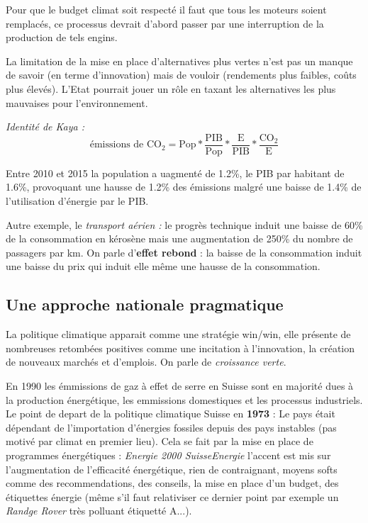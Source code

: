 \documentclass {article}
\newcommand{\V}[0]{\vspace{1\baselineskip}}
\begin{document}
\begin{itemize}
Pour que le budget climat soit respecté il faut que tous les moteurs soient remplacés, ce processus devrait d'abord passer par une interruption de la production de tels engins.

La limitation de la mise en place d'alternatives plus vertes n'est pas un manque de savoir (en terme d'innovation) mais de vouloir (rendements plus faibles, coûts plus élevés). L'Etat pourrait jouer un rôle en taxant les alternatives les plus mauvaises pour l'environnement.
\V

\textit{Identité de Kaya :}
$$\boxed{\textrm{émissions de CO$_2$} = \textrm{Pop} * \frac{\textrm{PIB}}{\textrm{Pop}} * \frac{\textrm{E}}{\textrm{PIB}} * \frac{\textrm{CO}_2}{\textrm{E}}}$$
\V

Entre 2010 et 2015 la population a uagmenté de 1.2\%, le  PIB par habitant de 1.6\%, provoquant une hausse de 1.2\% des émissions malgré une baisse de 1.4\% de l'utilisation d'énergie par le PIB.

Autre exemple, le \textit{transport aérien :} le progrès technique induit une baisse de 60\% de la consommation en kérosène mais une augmentation de 250\% du nombre de passagers par km.
On parle d'\textbf{effet rebond} : la baisse de la consommation induit une baisse du prix qui induit elle même une hausse de la consommation.

\subsection{Une approche nationale pragmatique}
\bigskip

La politique climatique apparait comme une stratégie win/win, elle présente de nombreuses retombées positives comme une incitation à l'innovation, la création de nouveaux marchés et d'emplois. On parle de \emph{croissance verte}.
\V

En 1990 les émmissions de gaz à effet de serre en Suisse sont en majorité dues à la production énergétique, les emmissions domestiques et les processus industriels.
Le point de depart de la politique climatique Suisse en \textbf{1973} :
Le pays était dépendant de l'importation d'énergies fossiles depuis des pays instables (pas motivé par climat en premier lieu).
Cela se fait par la mise en place de programmes énergétiques : \emph{Energie 2000 SuisseEnergie} l'accent est mis sur l'augmentation de l'efficacité énergétique, rien de contraignant, moyens softs comme des recommendations, des conseils, la mise en place d'un budget, des étiquettes énergie (même s'il faut relativiser ce dernier point par exemple un \emph{Randge Rover} très polluant étiquetté A...).
\V


\end{itemize}
\end{document}
